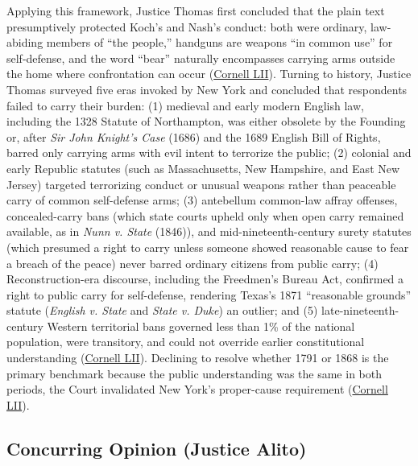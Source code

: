 \documentclass[12pt]{article}
\begin{document}
Applying this framework, Justice Thomas first concluded that the plain text presumptively protected Koch's and Nash's conduct: both were ordinary, law-abiding members of ``the people,'' handguns are weapons ``in common use'' for self-defense, and the word ``bear'' naturally encompasses carrying arms outside the home where confrontation can occur (\href{https://www.law.cornell.edu/supremecourt/text/20-843}{Cornell LII}). Turning to history, Justice Thomas surveyed five eras invoked by New York and concluded that respondents failed to carry their burden: (1) medieval and early modern English law, including the 1328 Statute of Northampton, was either obsolete by the Founding or, after \textit{Sir John Knight's Case} (1686) and the 1689 English Bill of Rights, barred only carrying arms with evil intent to terrorize the public; (2) colonial and early Republic statutes (such as Massachusetts, New Hampshire, and East New Jersey) targeted terrorizing conduct or unusual weapons rather than peaceable carry of common self-defense arms; (3) antebellum common-law affray offenses, concealed-carry bans (which state courts upheld only when open carry remained available, as in \textit{Nunn v. State} (1846)), and mid-nineteenth-century surety statutes (which presumed a right to carry unless someone showed reasonable cause to fear a breach of the peace) never barred ordinary citizens from public carry; (4) Reconstruction-era discourse, including the Freedmen's Bureau Act, confirmed a right to public carry for self-defense, rendering Texas's 1871 ``reasonable grounds'' statute (\textit{English v. State} and \textit{State v. Duke}) an outlier; and (5) late-nineteenth-century Western territorial bans governed less than 1\% of the national population, were transitory, and could not override earlier constitutional understanding (\href{https://www.law.cornell.edu/supremecourt/text/20-843}{Cornell LII}). Declining to resolve whether 1791 or 1868 is the primary benchmark because the public understanding was the same in both periods, the Court invalidated New York's proper-cause requirement (\href{https://www.law.cornell.edu/supremecourt/text/20-843}{Cornell LII}).

\subsection{Concurring Opinion (Justice Alito)}
\end{document}
